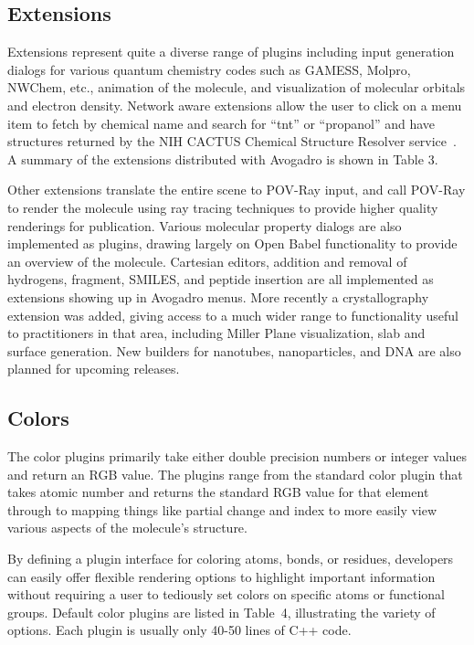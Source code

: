 \documentclass[10pt]{bmc_article}
\newenvironment{bmcformat}{\begin{raggedright}
  \baselineskip20pt\sloppy\setboolean{publ}{false}}{\end{raggedright}
  \baselineskip20pt\sloppy}
\begin{document}
\begin{bmcformat}
\subsection*{Extensions}

Extensions represent quite a diverse range of plugins including
input generation dialogs for various quantum chemistry codes such as GAMESS,
Molpro, NWChem, etc., animation of the molecule, and visualization of
molecular orbitals and electron density. Network aware extensions allow the user
to click on a menu item to fetch by chemical name and search for ``tnt'' or
``propanol'' and have structures returned by the NIH CACTUS Chemical Structure
Resolver service~\cite{StructureResolver}. A summary of the extensions
distributed with Avogadro is shown in Table 3.

Other extensions translate the entire scene to POV-Ray input, and call POV-Ray
to render the molecule using ray tracing techniques to provide higher quality
renderings for publication. Various molecular property dialogs are also
implemented as plugins, drawing largely on Open Babel functionality to provide
an overview of the molecule. Cartesian editors, addition and removal of
hydrogens, fragment, SMILES, and peptide insertion are all implemented as
extensions showing up in Avogadro menus. More recently a crystallography
extension was added, giving access to a much wider range to functionality
useful to practitioners in that area, including Miller Plane
visualization, slab and surface generation. New builders for
nanotubes, nanoparticles, and DNA are also planned for upcoming releases.

\subsection*{Colors}

The color plugins primarily take either double precision numbers or integer
values and return an RGB value. The plugins range from the standard color
plugin that takes atomic number and returns the standard RGB value for that
element through to mapping things like partial change and index to more easily
view various aspects of the molecule's structure.

By defining a plugin interface for coloring atoms, bonds, or residues,
developers can easily offer flexible rendering options to highlight
important information without requiring a user to tediously set colors
on specific atoms or functional groups. Default color plugins are
listed in Table~4, illustrating the variety of
options. Each plugin is usually only 40-50 lines of C++ code.


\end{bmcformat}
\end{document}
